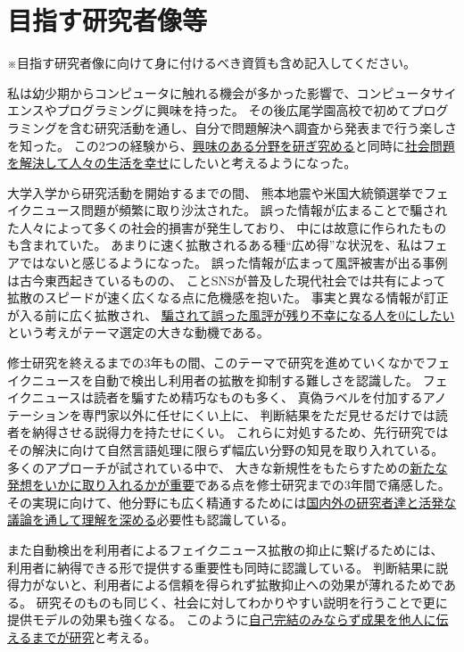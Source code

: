 
\section{目指す研究者像等}
\begin{spacing}{1.08}
\noindent
{} {\footnotesize ※目指す研究者像に向けて身に付けるべき資質も含め記入してください。}

私は幼少期からコンピュータに触れる機会が多かった影響で、コンピュータサイエンスやプログラミングに興味を持った。
その後広尾学園高校で初めてプログラミングを含む研究活動を通し、自分で問題解決へ調査から発表まで行う楽しさを知った。
この2つの経験から、\underline{興味のある分野を研ぎ究める}と同時に\underline{社会問題を解決して人々の生活を幸せ}にしたいと考えるようになった。

大学入学から研究活動を開始するまでの間、
熊本地震や米国大統領選挙でフェイクニュース問題が頻繁に取り沙汰された。
誤った情報が広まることで騙された人々によって多くの社会的損害が発生しており、
中には故意に作られたものも含まれていた。
あまりに速く拡散されるある種``広め得''な状況を、私はフェアではないと感じるようになった。
誤った情報が広まって風評被害が出る事例は古今東西起きているものの、
ことSNSが普及した現代社会では共有によって拡散のスピードが速く広くなる点に危機感を抱いた。
事実と異なる情報が訂正が入る前に広く拡散され、
\underline{騙されて誤った風評が残り不幸になる人を0にしたい}という考えがテーマ選定の大きな動機である。

修士研究を終えるまでの3年もの間、このテーマで研究を進めていくなかでフェイクニュースを自動で検出し利用者の拡散を抑制する難しさを認識した。
フェイクニュースは読者を騙すため精巧なものも多く、
真偽ラベルを付加するアノテーションを専門家以外に任せにくい上に、
判断結果をただ見せるだけでは読者を納得させる説得力を持たせにくい。
これらに対処するため、先行研究ではその解決に向けて自然言語処理に限らず幅広い分野の知見を取り入れている。
多くのアプローチが試されている中で、
大きな新規性をもたらすための\underline{新たな発想をいかに取り入れるかが重要}である点を修士研究までの3年間で痛感した。
その実現に向けて、他分野にも広く精通するためには\underline{国内外の研究者達と活発な議論を通して理解を深める}必要性も認識している。

また自動検出を利用者によるフェイクニュース拡散の抑止に繋げるためには、
利用者に納得できる形で提供する重要性も同時に認識している。
判断結果に説得力がないと、利用者による信頼を得られず拡散抑止への効果が薄れるためである。
研究そのものも同じく、社会に対してわかりやすい説明を行うことで更に提供モデルの効果も強くなる。
このように\underline{自己完結のみならず成果を他人に伝えるまでが研究}と考える。


\end{spacing}
